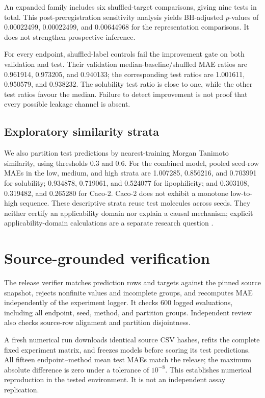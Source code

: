 \documentclass[10pt,twocolumn,a4paper]{article}
\theoremstyle{definition}\newtheorem{observation}{Numerical observation}
\theoremstyle{remark}\newtheorem{remark}{Remark}
\begin{document}
An expanded family includes six shuffled-target comparisons, giving nine tests in total. This post-preregistration sensitivity analysis yields BH-adjusted $p$-values of 0.00022499, 0.00022499, and 0.00644968 for the representation comparisons. It does not strengthen prospective inference.

For every endpoint, shuffled-label controls fail the improvement gate on both validation and test. Their validation median-baseline/shuffled MAE ratios are 0.961914, 0.973205, and 0.940133; the corresponding test ratios are 1.001611, 0.950579, and 0.938232. The solubility test ratio is close to one, while the other test ratios favour the median. Failure to detect improvement is not proof that every possible leakage channel is absent.

\subsection{Exploratory similarity strata}
We also partition test predictions by nearest-training Morgan Tanimoto similarity, using thresholds 0.3 and 0.6. For the combined model, pooled seed-row MAEs in the low, medium, and high strata are 1.007285, 0.856216, and 0.703991 for solubility; 0.934878, 0.719061, and 0.524077 for lipophilicity; and 0.303108, 0.319482, and 0.265280 for Caco-2. Caco-2 does not exhibit a monotone low-to-high sequence. These descriptive strata reuse test molecules across seeds. They neither certify an applicability domain nor explain a causal mechanism; explicit applicability-domain calculations are a separate research question \cite{hosni}.

\section{Source-grounded verification}\label{sec:verification}
The release verifier matches prediction rows and targets against the pinned source snapshot, rejects nonfinite values and incomplete groups, and recomputes MAE independently of the experiment logger. It checks 600 logged evaluations, including all endpoint, seed, method, and partition groups. Independent review also checks source-row alignment and partition disjointness.

A fresh numerical run downloads identical source CSV hashes, refits the complete fixed experiment matrix, and freezes models before scoring its test predictions. All fifteen endpoint--method mean test MAEs match the release; the maximum absolute difference is zero under a tolerance of $10^{-8}$. This establishes numerical reproduction in the tested environment. It is not an independent assay replication.
\end{document}
